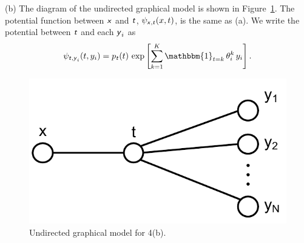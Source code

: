 \documentclass{article}
\newcommand{\s}[1]{\textsf{\textit{#1}}}
\begin{document}
%
\noindent
(b) The diagram of the undirected graphical model is shown in Figure~\ref{f:4b}.
The potential function between $\s{x}$ and $\s{t}$, $\psi_{\s{x}, \s{t}}(x, t)$,
is the same as (a).
We write the potential between $\s{t}$ and each $\s{y}_i$ as
\begin{align*}
\psi_{\s{t}, \s{y}_i}(t, y_i) = p_{\s{t}}(t)\,\exp\left[\sum_{k=1}^K\mathbbm{1}_{t=k}\,\theta_i^k\,y_i\right].
\end{align*}

\begin{figure}[h]
  \centering
  \includegraphics[width=0.3\columnwidth]{4b.pdf}
  \caption{Undirected graphical model for 4(b).}
  \label{f:4b}
\end{figure}
\end{document}
